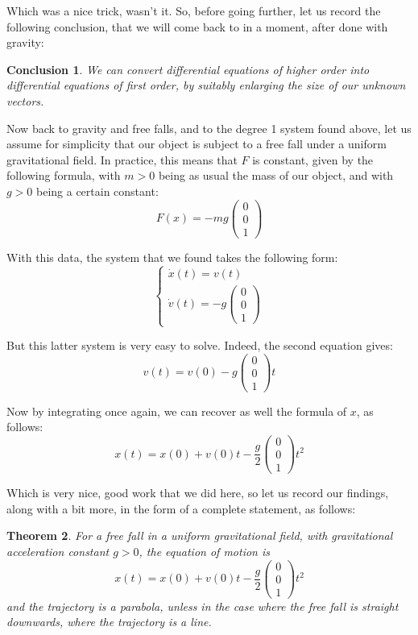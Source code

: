 \documentclass[12pt]{amsbook}
\newtheorem{theorem}{Theorem}[chapter]
\newtheorem{conclusion}[theorem]{Conclusion}
\begin{document}
Which was a nice trick, wasn't it. So, before going further, let us record the following conclusion, that we will come back to in a moment, after done with gravity:

\begin{conclusion}
We can convert differential equations of higher order into differential equations of first order, by suitably enlarging the size of our unknown vectors.
\end{conclusion}

Now back to gravity and free falls, and to the degree 1 system found above, let us assume for simplicity that our object is subject to a free fall under a uniform gravitational field. In practice, this means that $F$ is constant, given by the following formula, with $m>0$ being as usual the mass of our object, and with $g>0$ being a certain constant:
$$F(x)=-mg\begin{pmatrix}0\\ 0\\1\end{pmatrix}$$

With this data, the system that we found takes the following form:
$$\begin{cases}
\dot{x}(t)=v(t)\\
\dot{v}(t)=-g\begin{pmatrix}0\\ 0\\1\end{pmatrix}
\end{cases}$$

But this latter system is very easy to solve. Indeed, the second equation gives:
$$v(t)=v(0)-g\begin{pmatrix}0\\ 0\\1\end{pmatrix}t$$

Now by integrating once again, we can recover as well the formula of $x$, as follows:
$$x(t)=x(0)+v(0)t-\frac{g}{2}\begin{pmatrix}0\\ 0\\1\end{pmatrix}t^2$$

Which is very nice, good work that we did here, so let us record our findings, along with a bit more, in the form of a complete statement, as follows:

\begin{theorem}
For a free fall in a uniform gravitational field, with gravitational acceleration constant $g>0$, the equation of motion is
$$x(t)=x(0)+v(0)t-\frac{g}{2}\begin{pmatrix}0\\ 0\\1\end{pmatrix}t^2$$
and the trajectory is a parabola, unless in the case where the free fall is straight downwards, where the trajectory is a line.
\end{theorem}
\end{document}
